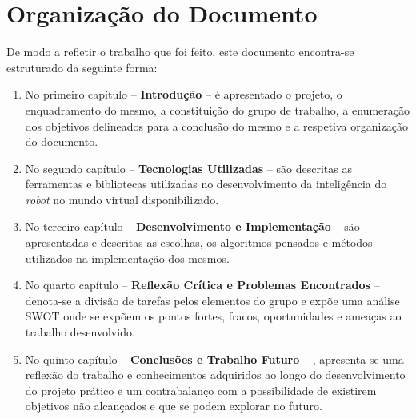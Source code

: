 \section{Organização do Documento}
\label{sec:organ}
De modo a refletir o trabalho que foi feito, este documento encontra-se estruturado da seguinte forma:
\begin{enumerate}
\item No primeiro capítulo -- \textbf{Introdução} -- é apresentado o projeto, o enquadramento do mesmo, a constituição do grupo de trabalho, a enumeração dos objetivos delineados para a conclusão do mesmo e a respetiva organização do documento.
\item No segundo capítulo -- \textbf{Tecnologias Utilizadas} -- são descritas as ferramentas e bibliotecas utilizadas no desenvolvimento da inteligência do \emph{robot} no mundo virtual disponibilizado.
\item No terceiro capítulo -- \textbf{Desenvolvimento e Implementação} -- são apresentadas e descritas as escolhas, os algoritmos pensados e métodos utilizados na implementação dos mesmos.
\item No quarto capítulo -- \textbf{Reflexão Crítica e Problemas Encontrados} -- denota-se a divisão de tarefas pelos elementos do grupo e expõe uma análise \ac{SWOT} onde se expõem os pontos fortes, fracos, oportunidades e ameaças ao trabalho desenvolvido.
\item No quinto capítulo -- \textbf{Conclusões e Trabalho Futuro} -- , apresenta-se uma reflexão do trabalho e conhecimentos adquiridos ao longo do desenvolvimento do projeto prático e um contrabalanço com a possibilidade de existirem objetivos não alcançados e que se podem explorar no futuro.
\end{enumerate}